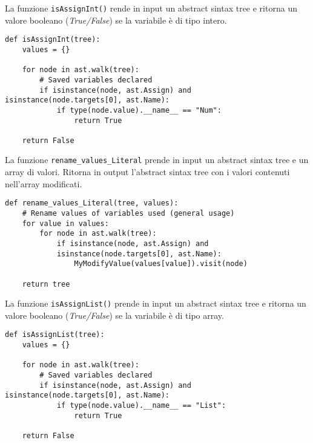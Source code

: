 \documentclass[a4paper,oneside,openright,titlepage,10pt,footinclude,headinclude]{scrbook}
\begin{document}
La funzione \texttt{isAssignInt()} rende in input un abstract sintax tree e ritorna un valore booleano (\textit{True/False}) se la variabile è di tipo intero.
\begin{graybox}[innerleftmargin=2,]
\begin{lstlisting}
def isAssignInt(tree):
    values = {}

    for node in ast.walk(tree):
        # Saved variables declared
        if isinstance(node, ast.Assign) and isinstance(node.targets[0], ast.Name):
            if type(node.value).__name__ == "Num":
                return True

    return False
\end{lstlisting}
\end{graybox}


La funzione \texttt{rename\_values\_Literal} prende in input un abstract sintax tree e un array di valori. Ritorna in output l'abstract sintax tree con i valori contenuti nell'array modificati.
\begin{graybox}[innerleftmargin=2,]
\begin{lstlisting}
def rename_values_Literal(tree, values):
    # Rename values of variables used (general usage)
    for value in values:
        for node in ast.walk(tree):
            if isinstance(node, ast.Assign) and 
            isinstance(node.targets[0], ast.Name):
                MyModifyValue(values[value]).visit(node)

    return tree
\end{lstlisting}
\end{graybox}

La funzione \texttt{isAssignList()} prende in input un abstract sintax tree e ritorna un valore booleano (\textit{True/False}) se la variabile è di tipo array.
\begin{graybox}[innerleftmargin=2,]
\begin{lstlisting}
def isAssignList(tree):
    values = {}

    for node in ast.walk(tree):
        # Saved variables declared
        if isinstance(node, ast.Assign) and isinstance(node.targets[0], ast.Name):
            if type(node.value).__name__ == "List":
                return True

    return False
\end{lstlisting}
\end{graybox}
\end{document}
